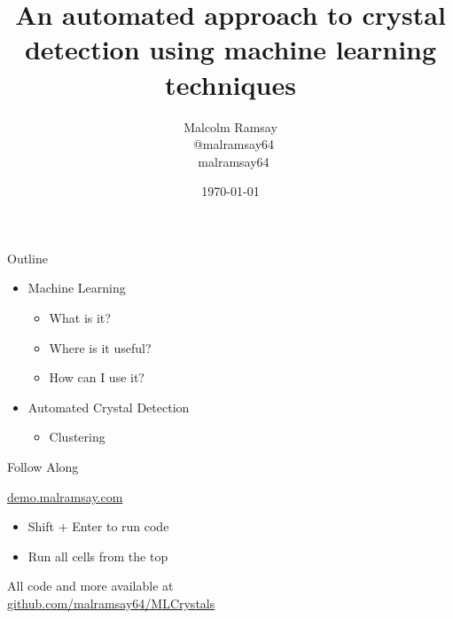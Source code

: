\documentclass[aspectratio=169, 14pt]{beamer}
\title{\large An automated approach to crystal detection using machine learning techniques}
\date{\today}
\author[Malcolm]{Malcolm Ramsay \\ \faTwitter~@malramsay64 \\ \faGithub~malramsay64}
\begin{document}
\begin{frame}
  {\fontsize{12}{14}\selectfont
  \titlepage{}
}
\end{frame}

\begin{frame}{Outline}

  \begin{itemize}
    \item Machine Learning
      \begin{itemize}
        \item What is it?
        \item Where is it useful?
        \item How can I use it?
      \end{itemize}
    \item Automated Crystal Detection
      \begin{itemize}
        \item Clustering
      \end{itemize}
  \end{itemize}
\end{frame}

\begin{frame}{Follow Along}
  \begin{center}
    \LARGE
    \url{demo.malramsay.com}
  \end{center}

  \begin{itemize}
    \item Shift + Enter to run code
    \item Run all cells from the top
  \end{itemize}

  All code and more available at \\
  \url{github.com/malramsay64/MLCrystals}

\end{frame}
\end{document}

